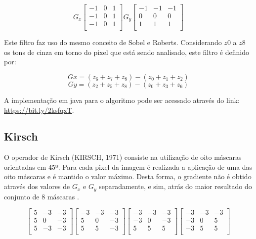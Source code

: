 \documentclass[
	12pt,				%
	oneside,			%
	a4paper,			%
	english,			%
	french,				%
	spanish,			%
	brazil,				%
	]{abntex2}
\begin{document}
\[
G_x
\begin{bmatrix}
    -1 & 0 & 1   \\ 
	-1 & 0 & 1   \\ 
	-1 & 0 & 1   \\    
\end{bmatrix} 
G_y
\begin{bmatrix}
    -1 & -1 & -1   \\ 
	 0 &  0 &  0   \\ 
	 1 &  1 &  1   \\    
\end{bmatrix} 
\]

Este filtro faz uso do mesmo conceito de Sobel e Roberts. Considerando \(z0\) a \(z8\) os tons de cinza em torno do pixel que está sendo analisado, este filtro é definido por:

\[Gx = (z_6 + z_7 + z_8) - (z_0 + z_1 + z_2)\]
\[Gy = (z_2 + z_5 + z_8) - (z_0 + z_3 + z_6)\]

A implementação em java para o algoritmo pode ser acessado através do link: \url{https://bit.ly/2ksfqxT}. 

\subsection{Kirsch}
O operador de Kirsch (KIRSCH, 1971) consiste na utilização de oito máscaras orientadas em 45º. Para cada pixel da imagem é realizada a aplicação de uma das oito máscaras e é mantido o valor máximo. Desta forma, o gradiente não é obtido através dos valores de \(G_x\) e \(G_y\) separadamente, e sim, atrás do maior resultado do conjunto de 8 máscaras \cite{pedriniSchwartz:2008}.

\[
\begin{bmatrix}
     5 & -3 & -3   \\ 
	 5 &  0 & -3   \\ 
	 5 & -3 & -3   \\    
\end{bmatrix} 
\begin{bmatrix}
    -3 & -3 & -3   \\
	 5 &  0 & -3   \\
	 5 &  5 & -3   \\
\end{bmatrix}
\begin{bmatrix}
    -3 & -3 & -3   \\
	-3 &  0 & -3   \\
	 5 &  5 &  5   \\
\end{bmatrix} 
\begin{bmatrix}
    -3 & -3 & -3   \\
	-3 &  0 &  5   \\
	-3 &  5 &  5   \\
\end{bmatrix}
\]
\end{document}
